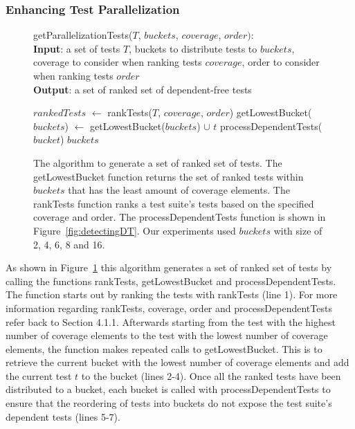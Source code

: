 \subsubsection{Enhancing Test Parallelization}
\begin{figure}[t]
	getParallelizationTests($\mathit{T}$, $\mathit{buckets}$, $\mathit{coverage}$, $\mathit{order}):$\\
	\textbf{Input}: a set of tests $\mathit{T}$, buckets to distribute tests to $\mathit{buckets}$, coverage to consider when ranking tests $\mathit{coverage}$, order to consider when ranking tests $\mathit{order}$\\
	\textbf{Output}: a set of ranked set of dependent-free tests\\
	 \begin{algorithmic}[1]
	 	\vspace{-5mm}
		\STATE $\mathit{rankedTests}$ $\leftarrow$ rankTests($\mathit{T}$, $\mathit{coverage}$, $\mathit{order}$)
			\STATE getLowestBucket($\mathit{buckets}$) $\leftarrow$ getLowestBucket($\mathit{buckets}$) $\cup$ $\mathit{t}$
		\ENDFOR
			\STATE processDependentTests($\mathit{bucket}$)
		\ENDFOR
		\RETURN $\mathit{buckets}$
	\end{algorithmic}
	\vspace{-3mm}
	\caption {
		The algorithm to generate a set of ranked set of tests. The getLowestBucket function returns the set of ranked tests within $\mathit{buckets}$ that has the least amount of coverage elements. The rankTests function ranks a test suite's tests based on the specified coverage and order. The processDependentTests function is shown in Figure~\ref{fig:detectingDT}. Our experiments used $\mathit{buckets}$ with size of 2, 4, 6, 8 and 16.
	}
	\label{fig:parallelization}
\end{figure}
As shown in Figure~\ref{fig:parallelization} this algorithm generates a set of ranked set of tests by calling the functions rankTests, getLowestBucket and processDependentTests. The function starts out by ranking the tests with rankTests (line 1). For more information regarding rankTests, coverage, order and processDependentTests refer back to Section 4.1.1. Afterwards starting from the test with the highest number of coverage elements to the test with the lowest number of coverage elements, the function makes repeated calls to getLowestBucket. This is to retrieve the current bucket with the lowest number of coverage elements and add the current test $\mathit{t}$ to the bucket (lines 2-4). Once all the ranked tests have been distributed to a bucket, each bucket is called with processDependentTests to ensure that the reordering of tests into buckets do not expose the test suite's dependent tests (lines 5-7). 